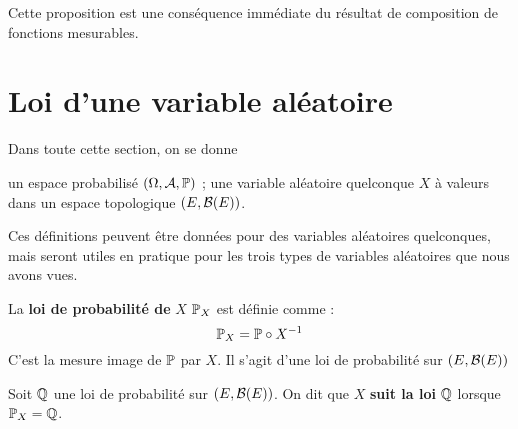 \documentclass[../integ-proba.tex]{subfiles}
\begin{document}
    \begin{rem}
        Cette proposition est une conséquence immédiate du résultat de composition de fonctions mesurables.
    \end{rem}

    \section{Loi d'une variable aléatoire}

    Dans toute cette section, on se donne
    \begin{itemize}
        \itemb un espace probabilisé $\left(\Omega, \mathcal{A}, \mathbb{P}\right)$ ;
        \itemb une variable aléatoire quelconque $X$ à valeurs dans un espace topologique $\left(E, \mathcal{B}(E)\right)$.
    \end{itemize}

    Ces définitions peuvent être données pour des variables aléatoires quelconques, mais seront utiles en pratique pour les trois types de variables aléatoires que nous avons vues.

    \begin{defi}
        La \textbf{loi de probabilité de} $X$ $\mathbb{P}_X$ est définie comme :
        \begin{displaymath}
            \mathbb{P}_X=\mathbb{P} \circ X^{-1}
        \end{displaymath}
        C'est la mesure image de $\mathbb{P}$ par $X$.
        Il s'agit d'une loi de probabilité sur $\left(E, \mathcal{B}(E) \right)$
    \end{defi}

    \begin{defi}
        Soit $\mathbb{Q}$ une loi de probabilité sur $\left(E, \mathcal{B}(E) \right)$.
        On dit que $X$ \textbf{suit la loi} $\mathbb{Q}$ lorsque $\mathbb{P}_X = \mathbb{Q}$.
    \end{defi}
\end{document}
